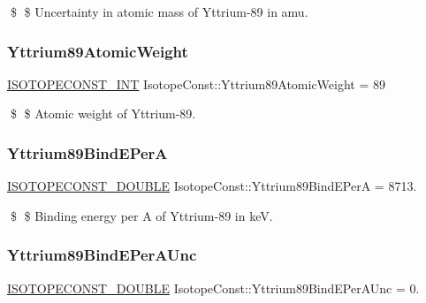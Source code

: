\$ \$ Uncertainty in atomic mass of Yttrium-\/89 in amu. \mbox{\label{group___isotope_const-_yttrium-_y89_gadb26df303d32aef37e64fee716b3f65b}} 
\subsubsection{\texorpdfstring{Yttrium89\+Atomic\+Weight}{Yttrium89AtomicWeight}}
{\footnotesize\ttfamily \mbox{\hyperlink{group___isotope_const-_macros_ga5f18360b3e99483a35c32d789e62621c}{I\+S\+O\+T\+O\+P\+E\+C\+O\+N\+S\+T\+\_\+\+I\+NT}} Isotope\+Const\+::\+Yttrium89\+Atomic\+Weight = 89}

\$ \$ Atomic weight of Yttrium-\/89. \mbox{\label{group___isotope_const-_yttrium-_y89_ga0315cbe91807924138842a97229e62ef}} 
\subsubsection{\texorpdfstring{Yttrium89\+Bind\+E\+PerA}{Yttrium89BindEPerA}}
{\footnotesize\ttfamily \mbox{\hyperlink{group___isotope_const-_macros_ga8f45a7272ce02c0b4c65c44636ed719a}{I\+S\+O\+T\+O\+P\+E\+C\+O\+N\+S\+T\+\_\+\+D\+O\+U\+B\+LE}} Isotope\+Const\+::\+Yttrium89\+Bind\+E\+PerA = 8713.}

\$ \$ Binding energy per A of Yttrium-\/89 in keV. \mbox{\label{group___isotope_const-_yttrium-_y89_ga9eb7b70a32bdf827c41c6750b4b54ac2}} 
\subsubsection{\texorpdfstring{Yttrium89\+Bind\+E\+Per\+A\+Unc}{Yttrium89BindEPerAUnc}}
{\footnotesize\ttfamily \mbox{\hyperlink{group___isotope_const-_macros_ga8f45a7272ce02c0b4c65c44636ed719a}{I\+S\+O\+T\+O\+P\+E\+C\+O\+N\+S\+T\+\_\+\+D\+O\+U\+B\+LE}} Isotope\+Const\+::\+Yttrium89\+Bind\+E\+Per\+A\+Unc = 0.}

